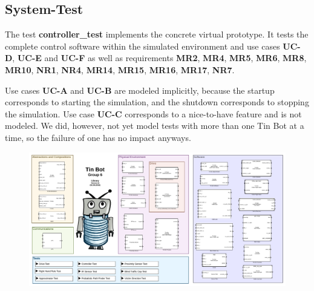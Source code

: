 \documentclass[a4paper,parskip,headheight=38pt]{scrartcl} %
\begin{document}
\subsection{System-Test}
The test \textbf{controller\_test} implements the concrete virtual prototype. It tests the complete control software within the simulated environment and use cases \textbf{UC-D}, \textbf{UC-E} and \textbf{UC-F} as well as requirements \textbf{MR2}, \textbf{MR4}, \textbf{MR5}, \textbf{MR6}, \textbf{MR8}, \textbf{MR10}, \textbf{NR1}, \textbf{NR4}, \textbf{MR14}, \textbf{MR15}, \textbf{MR16}, \textbf{MR17}, \textbf{NR7}. 


Use cases \textbf{UC-A} and \textbf{UC-B} are modeled implicitly, because the startup corresponds to starting the simulation, and the shutdown corresponds to stopping the simulation.
Use case \textbf{UC-C} corresponds to a nice-to-have feature and is not modeled. We did, however, not yet model tests with more than one Tin Bot at a time, so the failure of one has no impact anyways.

\pagestyle{empty}

\begin{landscape}
\begin{figure}[h]
\centering
\includegraphics[width=26cm]{library.pdf}
\label{}
\end{figure}
\end{landscape}
\end{document}
